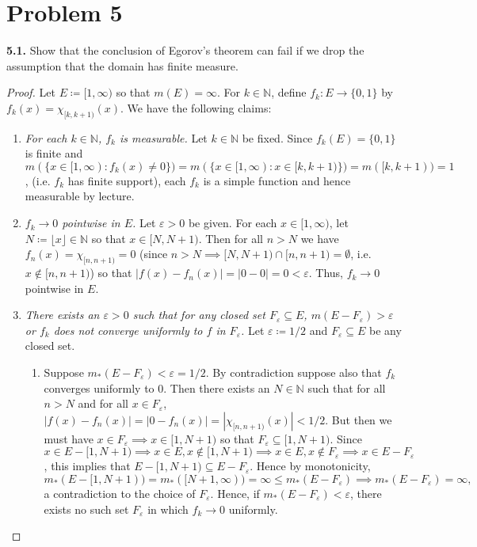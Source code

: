\section*{Problem 5}
\noindent \textbf{5.1.} Show that the conclusion of Egorov's theorem can fail if we drop the assumption that the domain has finite measure.
\begin{proof}
	Let \( E \coloneqq [1, \infty) \) so that \( m(E) = \infty \). For \( k \in \mathbb{N}  \), define \( f_k : E \to \{ 0,1 \}  \) by \( f_k(x) = \chi_{[k, k+1)}(x)  \). We have the following claims:
\begin{enumerate}
	\item \emph{For each \( k \in \mathbb{N}  \), \( f_k \) is measurable.} Let \( k \in \mathbb{N}  \) be fixed. Since \( f_k(E) = \{ 0,1 \} \) is finite and \( m(\{ x \in [1, \infty) : f_k(x) \neq 0 \}) = m(\{ x \in [1 , \infty) : x \in [k, k + 1) \}  )= m([k, k + 1)) = 1 \), (i.e. \( f_k \) has finite support), each \( f_k \) is a simple function and hence measurable by lecture.
	\item \emph{\( f_k \to 0 \) pointwise in \( E \).} Let \( \varepsilon > 0 \) be given. For each \( x \in [1, \infty) \), let \( N \coloneqq \lfloor x \rfloor \in \mathbb{N}  \) so that \( x \in [N, N + 1) \). Then for all \( n > N \) we have \( f_n(x) = \chi_{[n, n+1)} = 0 \) (since \( n > N \implies [N, N+1) \cap [n, n+1) = \emptyset  \), i.e. \(x \notin [n, n+1) \)) so that \( |f(x) - f_n(x)| = |0 - 0| = 0 < \varepsilon  \). Thus, \( f_k \to 0 \) pointwise in \( E \).
	\item \emph{There exists an \( \varepsilon > 0 \) such that for any closed set \( F_\varepsilon \subseteq E \), \( m(E - F_\varepsilon ) > \varepsilon  \) or \( f_k \) does not converge uniformly to \( f \) in \( F_\varepsilon  \).} Let \( \varepsilon \coloneqq 1/2 \) and \( F_\varepsilon  \subseteq E \) be any closed set.
	\begin{enumerate}
			jwwef wef we f
		\item Suppose \( m_*(E - F_\varepsilon ) < \varepsilon  = 1/2 \). By contradiction suppose also that \( f_k \) converges uniformly to \( 0 \). Then there exists an \( N \in \mathbb{N}  \) such that for all \( n > N \) and for all \( x \in F_\varepsilon  \), \( |f(x) - f_n(x)| = |0-f_n(x)| = |\chi_{[n, n+1)}(x) | < 1/2.\) But then we must have \( x \in F_\varepsilon \implies x \in [1, N + 1) \) so that \( F_\varepsilon \subseteq [1, N+1) \). Since \( x \in E - [1,N+1) \implies x \in E, x \notin [1, N+1) \implies x \in E ,x \notin F_\varepsilon  \implies x \in E - F_\varepsilon  \), this implies that \( E - [1, N+1) \subseteq E - F_\varepsilon   \). Hence by monotonicity, \[m_*(E - [1,N+1) ) = m_*([N+1, \infty)) = \infty \leq m_*(E - F_\varepsilon ) \implies m_*(E - F_\varepsilon ) = \infty, \tag{\ast}  \] a contradiction to the choice of \( F_\varepsilon  \). Hence, if \( m_*(E - F_\varepsilon ) < \varepsilon  \), there exists no such set \( F_\varepsilon  \) in which \( f_k \to 0 \) uniformly.

\end{enumerate}
\end{enumerate}
\end{proof}
